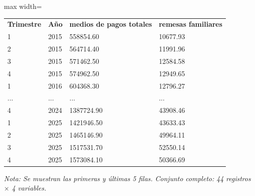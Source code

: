 

\begin{table}[htbp]

\centering

\begin{adjustbox}{max width=\textwidth}

\begin{tabular}{llll}

\rowcolor{ThemeBackground}
\rule{0pt}{0.45cm}
\textcolor{ThemeGold}{\bfseries Trimestre} & \textcolor{ThemeGold}{\bfseries Año} & \textcolor{ThemeGold}{\bfseries medios de pagos totales} & \textcolor{ThemeGold}{\bfseries remesas familiares} \\

1 & 2015 & 558854.60 & 10677.93 \\
2 & 2015 & 564714.40 & 11991.96 \\
3 & 2015 & 571462.50 & 12584.58 \\
4 & 2015 & 574962.50 & 12949.65 \\
1 & 2016 & 604368.30 & 12796.27 \\
... & ... & ... & ... \\
4 & 2024 & 1387724.90 & 43908.46 \\
1 & 2025 & 1421946.50 & 43633.43 \\
2 & 2025 & 1465146.90 & 49964.11 \\
3 & 2025 & 1517531.70 & 52550.14 \\
4 & 2025 & 1573084.10 & 50366.69 \\
\bottomrule
\end{tabular}

\end{adjustbox}

\vspace{0.15cm}
{\raggedright\sffamily\footnotesize\color{ThemeMuted}
\textit{Nota: Se muestran las primeras y últimas 5 filas. Conjunto completo: 44 registros $\times$ 4 variables.}}

\end{table}
